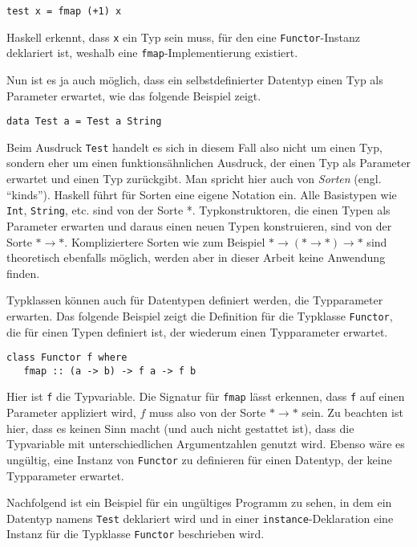 \begin{verbatim}
test x = fmap (+1) x
\end{verbatim}

Haskell erkennt, dass \texttt{x} ein Typ sein muss, für den eine \texttt{Functor}-Instanz deklariert ist, weshalb eine
\texttt{fmap}-Implementierung existiert.

Nun ist es ja auch möglich, dass ein selbstdefinierter Datentyp einen Typ als Parameter erwartet, wie das folgende Beispiel
zeigt.

\begin{verbatim}
data Test a = Test a String
\end{verbatim}

Beim Ausdruck \texttt{Test} handelt es sich in diesem Fall also nicht um einen Typ, sondern eher um einen funktionsähnlichen Ausdruck, der
einen Typ als Parameter erwartet und einen Typ zurückgibt. Man spricht hier auch von \textit{Sorten} (engl. ``kinds''). Haskell
führt für Sorten eine eigene Notation ein. Alle Basistypen wie \texttt{Int}, \texttt{String}, etc. sind von der Sorte *.
Typkonstruktoren, die einen Typen als Parameter erwarten und daraus einen neuen Typen konstruieren, sind von der Sorte
$* \rightarrow *$.
Kompliziertere Sorten wie zum Beispiel $* \rightarrow (* \rightarrow *) \rightarrow *$ sind theoretisch ebenfalls möglich,
werden aber in dieser Arbeit keine Anwendung finden.

Typklassen können auch für Datentypen definiert werden, die Typparameter erwarten. Das folgende Beispiel zeigt die
Definition für die Typklasse \texttt{Functor}, die für einen Typen definiert ist, der wiederum einen Typparameter erwartet.

\begin{verbatim}
class Functor f where
   fmap :: (a -> b) -> f a -> f b
\end{verbatim}

Hier ist \texttt{f} die Typvariable. Die Signatur für \texttt{fmap} lässt erkennen, dass \texttt{f} auf einen Parameter appliziert
wird, $f$ muss also von der Sorte $* \rightarrow *$ sein. Zu beachten ist hier, dass es keinen Sinn macht (und auch nicht
gestattet ist), dass die Typvariable mit unterschiedlichen Argumentzahlen genutzt wird. Ebenso wäre es ungültig,
eine Instanz von \texttt{Functor} zu definieren für einen Datentyp, der keine Typparameter erwartet.

Nachfolgend ist ein Beispiel für ein ungültiges Programm zu sehen, in dem ein Datentyp namens \texttt{Test} deklariert wird und in einer \texttt{instance}-Deklaration
eine Instanz für die Typklasse \texttt{Functor} beschrieben wird.

